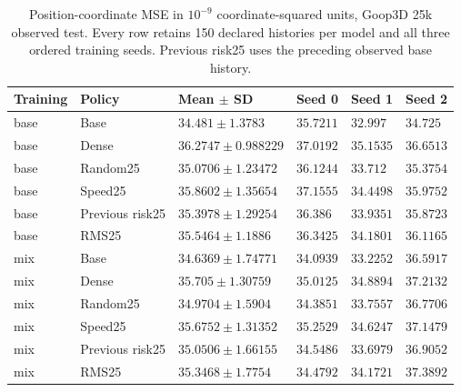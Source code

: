 \begin{table}[p]
\centering\scriptsize
\caption{Position-coordinate MSE in $10^{-9}$ coordinate-squared units, Goop3D 25k observed test. Every row retains 150 declared histories per model and all three ordered training seeds. Previous risk25 uses the preceding observed base history.}
\label{tab:goop3d25k-observed-position-test}
\setlength{\tabcolsep}{3pt}
\begin{tabular}{llllll}
\toprule
Training & Policy & Mean $\pm$ SD & Seed 0 & Seed 1 & Seed 2\\
\midrule
base & Base & $34.481\pm1.3783$ & $35.7211$ & $32.997$ & $34.725$\\
base & Dense & $36.2747\pm0.988229$ & $37.0192$ & $35.1535$ & $36.6513$\\
base & Random25 & $35.0706\pm1.23472$ & $36.1244$ & $33.712$ & $35.3754$\\
base & Speed25 & $35.8602\pm1.35654$ & $37.1555$ & $34.4498$ & $35.9752$\\
base & Previous risk25 & $35.3978\pm1.29254$ & $36.386$ & $33.9351$ & $35.8723$\\
base & RMS25 & $35.5464\pm1.1886$ & $36.3425$ & $34.1801$ & $36.1165$\\
mix & Base & $34.6369\pm1.74771$ & $34.0939$ & $33.2252$ & $36.5917$\\
mix & Dense & $35.705\pm1.30759$ & $35.0125$ & $34.8894$ & $37.2132$\\
mix & Random25 & $34.9704\pm1.5904$ & $34.3851$ & $33.7557$ & $36.7706$\\
mix & Speed25 & $35.6752\pm1.31352$ & $35.2529$ & $34.6247$ & $37.1479$\\
mix & Previous risk25 & $35.0506\pm1.66155$ & $34.5486$ & $33.6979$ & $36.9052$\\
mix & RMS25 & $35.3468\pm1.7754$ & $34.4792$ & $34.1721$ & $37.3892$\\
\bottomrule
\end{tabular}
\end{table}

